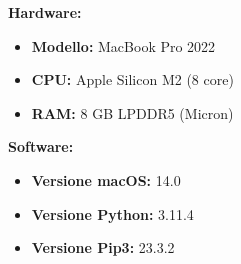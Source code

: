 \documentclass{article}
\begin{document}
\begin{multicols}{2}
    \textbf{Hardware:}
    \begin{itemize}
        \item \textbf{Modello:} MacBook Pro 2022
        \item \textbf{CPU:} Apple Silicon M2 (8 core)
        \item \textbf{RAM:} 8 GB LPDDR5 (Micron)
    \end{itemize}
    
    \columnbreak
    
    \textbf{Software:}
    \begin{itemize}
        \item \textbf{Versione macOS:} 14.0
        \item \textbf{Versione Python:} 3.11.4
        \item \textbf{Versione Pip3:} 23.3.2
    \end{itemize}
\end{multicols}

\vspace{20pt}

\printbibliography[heading=bibintoc, title={Bibliografia}]  
\end{document}
